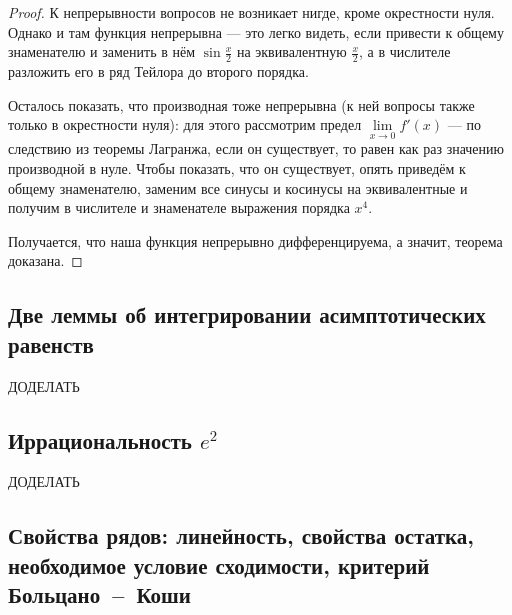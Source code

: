 \begin{proof}
	К непрерывности вопросов не возникает нигде, кроме окрестности нуля. Однако и там функция непрерывна --- это легко видеть, если привести к общему знаменателю и заменить в нём \(\sin \frac{x}{2}\) на эквивалентную \(\frac{x}{2}\), а в числителе разложить его в ряд Тейлора до второго порядка.
	
	Осталось показать, что производная тоже непрерывна (к ней вопросы также только в окрестности нуля): для этого рассмотрим предел \(\lim\limits_{x \to 0} f'(x)\) --- по следствию из теоремы Лагранжа, если он существует, то равен как раз значению производной в нуле. Чтобы показать, что он существует, опять приведём к общему знаменателю, заменим все синусы и косинусы на эквивалентные и получим в числителе и знаменателе выражения порядка \(x^4\).
	
	Получается, что наша функция непрерывно дифференцируема, а значит, теорема доказана.
\end{proof}

\subsection{Две леммы об интегрировании асимптотических равенств}

ДОДЕЛАТЬ

\subsection{Иррациональность \(e^2\)}

ДОДЕЛАТЬ

\subsection{Свойства рядов: линейность, свойства остатка, необходимое условие сходимости, критерий Больцано~--~Коши}

